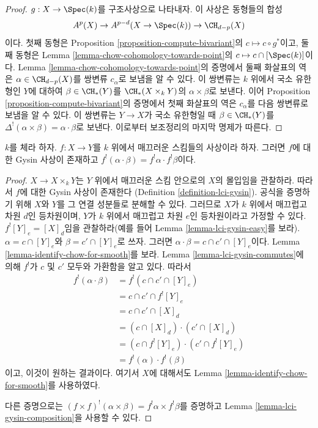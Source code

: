 \begin{proof}
$g : X \to \Spec(k)$를 구조사상으로 나타내자. 이 사상은 동형들의 합성
$$
A^p(X) \to A^{p - d}(X \to \Spec(k)) \to \CH_{d - p}(X)
$$
이다. 첫째 동형은 Proposition \ref{proposition-compute-bivariant}의
$c \mapsto c \circ g^*$이고, 둘째 동형은 Lemma
\ref{lemma-chow-cohomology-towards-point}의
$c \mapsto c \cap [\Spec(k)]$이다. Lemma
\ref{lemma-chow-cohomology-towards-point}의 증명에서 둘째 화살표의
역은 $\alpha \in \CH_{d - p}(X)$를 쌍변류 $c_\alpha$로 보냄을 알 수
있다. 이 쌍변류는 $k$ 위에서 국소 유한형인 $Y$에 대하여
$\beta \in \CH_*(Y)$를 $\CH_*(X \times_k Y)$의
$\alpha \times \beta$로 보낸다. 이어 Proposition
\ref{proposition-compute-bivariant}의 증명에서 첫째 화살표의 역은
$c_\alpha$를 다음 쌍변류로 보냄을 알 수 있다. 이 쌍변류는 $Y \to X$가
국소 유한형일 때 $\beta \in \CH_*(Y)$를
$\Delta^!(\alpha \times \beta) = \alpha \cdot \beta$로 보낸다.
이로부터 보조정리의 마지막 명제가 따른다.
\end{proof}

\begin{lemma}
\label{lemma-lci-gysin-product}
$k$를 체라 하자. $f : X \to Y$를 $k$ 위에서 매끄러운 스킴들의
사상이라 하자. 그러면 $f$에 대한 Gysin 사상이 존재하고
$f^!(\alpha \cdot \beta) = f^!\alpha \cdot f^!\beta$이다.
\end{lemma}

\begin{proof}
$X \to X \times_k Y$는 $Y$ 위에서 매끄러운 스킴 안으로의 $X$의
몰입임을 관찰하라. 따라서 $f$에 대한 Gysin 사상이 존재한다
(Definition \ref{definition-lci-gysin}). 공식을 증명하기 위해 $X$와
$Y$를 그 연결 성분들로 분해할 수 있다. 그러므로 $X$가 $k$ 위에서
매끄럽고 차원 $d$인 등차원이며, $Y$가 $k$ 위에서 매끄럽고 차원
$e$인 등차원이라고 가정할 수 있다.
$f^![Y]_e = [X]_d$임을 관찰하라(예를 들어 Lemma
\ref{lemma-lci-gysin-easy}를 보라).
$\alpha = c \cap [Y]_e$와 $\beta = c' \cap [Y]_e$로 쓰자.
그러면 $\alpha \cdot \beta = c \cap c' \cap [Y]_e$이다.
Lemma \ref{lemma-identify-chow-for-smooth}를 보라. Lemma
\ref{lemma-lci-gysin-commutes}에 의해 $f^!$가 $c$ 및 $c'$ 모두와
가환함을 알고 있다. 따라서
\begin{align*}
f^!(\alpha \cdot \beta)
& =
f^!(c \cap c' \cap [Y]_e) \\
& =
c \cap c' \cap f^![Y]_e \\
& =
c \cap c' \cap [X]_d \\
& =
(c \cap [X]_d) \cdot (c' \cap [X]_d) \\
& =
(c \cap f^![Y]_e) \cdot (c' \cap f^![Y]_e) \\
& =
f^!(\alpha) \cdot f^!(\beta)
\end{align*}
이고, 이것이 원하는 결과이다. 여기서 $X$에 대해서도 Lemma
\ref{lemma-identify-chow-for-smooth}를 사용하였다.

\medskip\noindent
다른 증명으로는
$(f \times f)^!(\alpha \times \beta) = f^!\alpha \times f^!\beta$를
증명하고 Lemma \ref{lemma-lci-gysin-composition}을 사용할 수 있다.
\end{proof}

